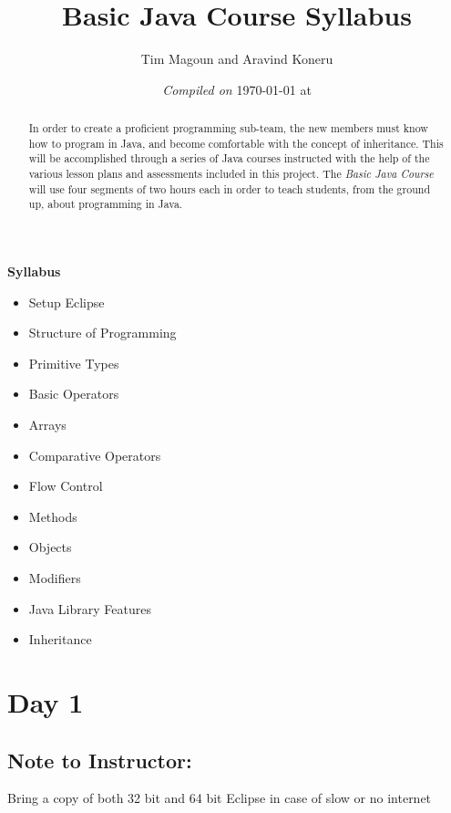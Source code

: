 \documentclass[11pt,fleqn]{article}
\begin{document}
\title{Basic Java Course Syllabus}%
\author{Tim Magoun and Aravind Koneru}
\date{\textit{Compiled on} \today \hspace{1mm} at \currenttime}
\maketitle

\begin{abstract}
In order to create a proficient programming sub-team, the new members must know how to program in Java, and become comfortable with the concept of inheritance. This will be accomplished through a series of Java courses instructed with the help of the various lesson plans and assessments included in this project. The \emph{Basic Java Course} will use four segments of two hours each in order to teach students, from the ground up, about programming in Java.
\end{abstract}

\begin{center}
\textbf{Syllabus}
\end{center}

\begin{itemize}
\item Setup Eclipse
\item Structure of Programming
\item Primitive Types
\item Basic Operators
\item Arrays
\item Comparative Operators
\item Flow Control
\item Methods
\item Objects
\item Modifiers
\item Java Library Features
\item Inheritance
\end{itemize}

\newpage

\section*{Day 1}
\subsection*{Note to Instructor:} Bring a copy of both 32 bit and 64 bit Eclipse in case of slow or no internet
\end{document}
